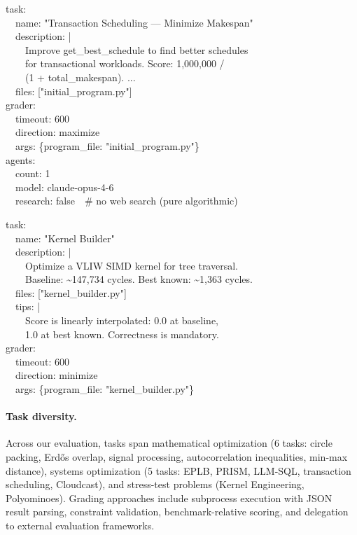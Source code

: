 \begin{promptbox}
\label{box:task_txn}
\ttfamily\scriptsize
task:\\
~~name: "Transaction Scheduling --- Minimize Makespan"\\
~~description: |\\
~~~~Improve get\_best\_schedule to find better schedules\\
~~~~for transactional workloads. Score: 1,000,000 /\\
~~~~(1 + total\_makespan). ...\\
~~files: ["initial\_program.py"]\\
grader:\\
~~timeout: 600\\
~~direction: maximize\\
~~args: \{program\_file: "initial\_program.py"\}\\
agents:\\
~~count: 1\\
~~model: claude-opus-4-6\\
~~research: false~~\# no web search (pure algorithmic)
\end{promptbox}

\begin{promptbox}
\label{box:task_kernel}
\ttfamily\scriptsize
task:\\
~~name: "Kernel Builder"\\
~~description: |\\
~~~~Optimize a VLIW SIMD kernel for tree traversal.\\
~~~~Baseline: \textasciitilde 147,734 cycles. Best known: \textasciitilde 1,363 cycles.\\
~~files: ["kernel\_builder.py"]\\
~~tips: |\\
~~~~Score is linearly interpolated: 0.0 at baseline,\\
~~~~1.0 at best known. Correctness is mandatory.\\
grader:\\
~~timeout: 600\\
~~direction: minimize\\
~~args: \{program\_file: "kernel\_builder.py"\}
\end{promptbox}

\paragraph{Task diversity.} Across our evaluation, tasks span mathematical optimization (6 tasks: circle packing, Erd\H{o}s overlap, signal processing, autocorrelation inequalities, min-max distance), systems optimization (5 tasks: EPLB, PRISM, LLM-SQL, transaction scheduling, Cloudcast), and stress-test problems (Kernel Engineering, Polyominoes). Grading approaches include subprocess execution with JSON result parsing, constraint validation, benchmark-relative scoring, and delegation to external evaluation frameworks.

